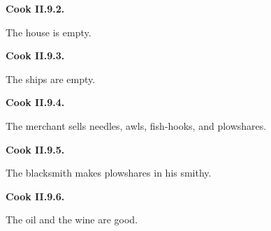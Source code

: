 \par\begin{minipage}{\linewidth}\raggedright
\textbf{Cook II.9.2.}

The house is empty.

\end{minipage}\par\addvspace{4pt}

\par\begin{minipage}{\linewidth}\raggedright
\textbf{Cook II.9.3.}

The ships are empty.

\end{minipage}\par\addvspace{4pt}

\par\begin{minipage}{\linewidth}\raggedright
\textbf{Cook II.9.4.}

The merchant sells needles, awls, fish-hooks, and plowshares.

\end{minipage}\par\addvspace{4pt}

\par\begin{minipage}{\linewidth}\raggedright
\textbf{Cook II.9.5.}

The blacksmith makes plowshares in his smithy.

\end{minipage}\par\addvspace{4pt}

\par\begin{minipage}{\linewidth}\raggedright
\textbf{Cook II.9.6.}

The oil and the wine are good.

\end{minipage}\par\addvspace{4pt}

